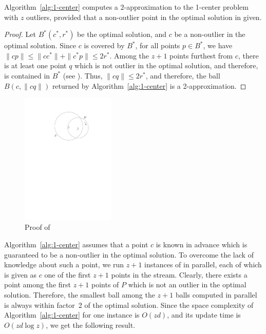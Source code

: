 \documentclass[envcountsame]{cls/cccg15}
\renewcommand{\O}{\ensuremath{{O}}}
\newcommand{\len}[1]{\|{#1}\|}
\newcommand{\lee}{\leqslant}
\renewcommand{\le}{\lee}
\begin{document}
\begin{theorem} \label{thm:1-center}
	Algorithm~\ref{alg:1-center} computes a $2$-approximation to
	the 1-center problem with $z$ outliers,
	provided that a non-outlier point in the optimal solution in given.
\end{theorem}


\begin{proof}
Let $B^*(c^*, r^*)$ be the optimal solution,
and $c$ be a non-outlier in the optimal solution.
Since $c$ is covered by $B^*$,
for all points $p \in B^*$, we have
$\len{cp} \le \len{cc^*} + \len{c^*p} \le 2r^*$.
Among the $z+1$ points furthest from $c$,
there is at least one point $q$ which is not outlier in the optimal solution,
and therefore, is contained in $B^*$
(see ). 
Thus, $\len{cq} \le 2r^*$,
and therefore, the ball $B(c, \len{cq})$ returned by Algorithm~\ref{alg:1-center} 
is a 2-approximation. 
\end{proof}


\begin{figure}[t]
	\centering
	\includegraphics[width=12em]{figs/one-center}
	\caption{Proof of }
	\label{fig:1center}
\end{figure}


\noindent
Algorithm~\ref{alg:1-center} 
assumes that a point $c$ is known in advance
which is guaranteed to be a non-outlier in the optimal solution. 
To overcome the lack of knowledge about such a point, 
we run $z+1$ instances of  in parallel,
each of which is given as $c$ one of the first $z + 1$ points in the stream.
Clearly, there exists a point among the first $z+1$ points of $P$
which is not an outlier in the optimal solution.
Therefore, the smallest ball among the $z+1$ balls computed in parallel
is always within factor~2 of the optimal solution. %
Since the space complexity of Algorithm~\ref{alg:1-center} for one instance is $\O(zd)$, 
and its update time is $\O (zd \log z)$, %
we get the following result.
\end{document}
